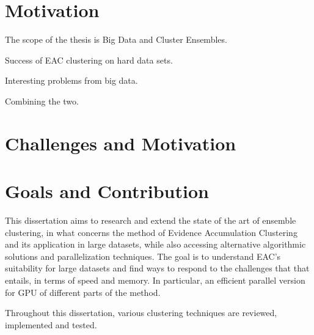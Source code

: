 \section{Motivation}
The scope of the thesis is Big Data and Cluster Ensembles.

Success of EAC clustering on hard data sets.

Interesting problems from big data.

Combining the two.

\section{Challenges and Motivation}

\section{Goals and Contribution}

This dissertation aims to research and extend the state of the art of ensemble clustering, in what concerns the method of Evidence Accumulation Clustering and its application in large datasets, while also accessing alternative algorithmic solutions and parallelization techniques. The goal is to understand EAC's suitability for large datasets and find ways to respond to the challenges that that entails, in terms of speed and memory. In particular, an efficient parallel version for GPU of different parts of the method.

Throughout this dissertation, various clustering techniques are reviewed, implemented and tested.

